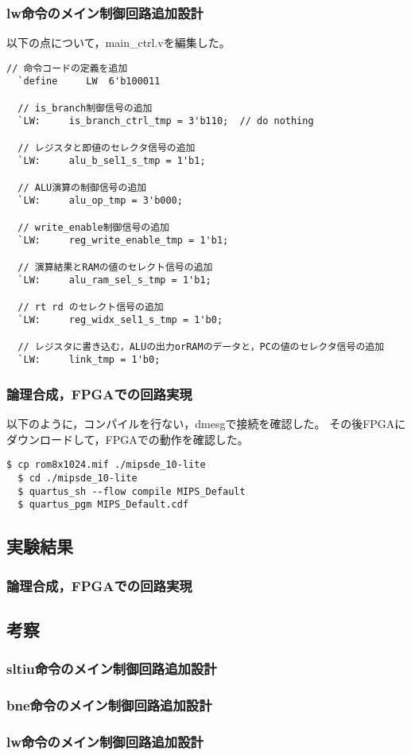 \subsubsection{lw命令のメイン制御回路追加設計}
以下の点について，main\_ctrl.vを編集した。
\begin{lstlisting}[caption={lw命令の追加設計},label={lw命令の追加設計}]
  // 命令コードの定義を追加
  `define     LW  6'b100011

  // is_branch制御信号の追加
  `LW:     is_branch_ctrl_tmp = 3'b110;  // do nothing
  
  // レジスタと即値のセレクタ信号の追加
  `LW:     alu_b_sel1_s_tmp = 1'b1;

  // ALU演算の制御信号の追加
  `LW:     alu_op_tmp = 3'b000;

  // write_enable制御信号の追加
  `LW:     reg_write_enable_tmp = 1'b1;

  // 演算結果とRAMの値のセレクト信号の追加
  `LW:     alu_ram_sel_s_tmp = 1'b1;

  // rt rd のセレクト信号の追加
  `LW:     reg_widx_sel1_s_tmp = 1'b0;

  // レジスタに書き込む，ALUの出力orRAMのデータと，PCの値のセレクタ信号の追加
  `LW:     link_tmp = 1'b0;
\end{lstlisting}

\subsubsection{論理合成，FPGAでの回路実現}
以下のように，コンパイルを行ない，dmesgで接続を確認した。
その後FPGAにダウンロードして，FPGAでの動作を確認した。

\begin{lstlisting}[caption={コンパイル，ダウンロード},label={コンパイル，ダウンロード4-2}]
  $ cp rom8x1024.mif ./mipsde_10-lite
  $ cd ./mipsde_10-lite
  $ quartus_sh --flow compile MIPS_Default
  $ quartus_pgm MIPS_Default.cdf 
\end{lstlisting}

\subsection{実験結果}
\subsubsection{論理合成，FPGAでの回路実現}

\subsection{考察}
\subsubsection{sltiu命令のメイン制御回路追加設計}
\subsubsection{bne命令のメイン制御回路追加設計}
\subsubsection{lw命令のメイン制御回路追加設計}
